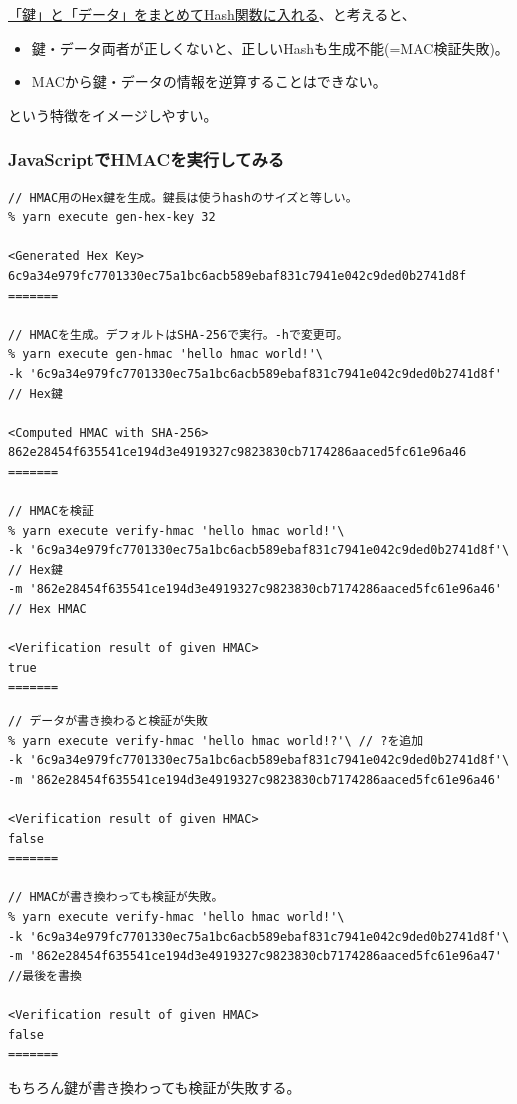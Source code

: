 \documentclass[12pt,dvipdfmx]{beamer}
\begin{document}
\begin{frame}
\underline{「鍵」と「データ」をまとめてHash関数に入れる}、と考えると、
\begin{itemize}
 \item 鍵・データ両者が正しくないと、正しいHashも生成不能(=MAC検証失敗)。
 \item MACから鍵・データの情報を逆算することはできない。
\end{itemize}
という特徴をイメージしやすい。
\end{frame}

\begin{frame}[fragile]
\frametitle{JavaScriptでHMACを実行してみる}
\begin{exampleblock}{}
\scriptsize
\begin{verbatim}
// HMAC用のHex鍵を生成。鍵長は使うhashのサイズと等しい。
% yarn execute gen-hex-key 32 

<Generated Hex Key>
6c9a34e979fc7701330ec75a1bc6acb589ebaf831c7941e042c9ded0b2741d8f
=======

// HMACを生成。デフォルトはSHA-256で実行。-hで変更可。
% yarn execute gen-hmac 'hello hmac world!'\
-k '6c9a34e979fc7701330ec75a1bc6acb589ebaf831c7941e042c9ded0b2741d8f' // Hex鍵

<Computed HMAC with SHA-256>
862e28454f635541ce194d3e4919327c9823830cb7174286aaced5fc61e96a46
=======

// HMACを検証
% yarn execute verify-hmac 'hello hmac world!'\
-k '6c9a34e979fc7701330ec75a1bc6acb589ebaf831c7941e042c9ded0b2741d8f'\ // Hex鍵
-m '862e28454f635541ce194d3e4919327c9823830cb7174286aaced5fc61e96a46' // Hex HMAC

<Verification result of given HMAC>
true
=======
\end{verbatim}
\end{exampleblock}
\end{frame}


\begin{frame}[fragile]
\begin{exampleblock}{}
\scriptsize
\begin{verbatim}
// データが書き換わると検証が失敗
% yarn execute verify-hmac 'hello hmac world!?'\ // ?を追加
-k '6c9a34e979fc7701330ec75a1bc6acb589ebaf831c7941e042c9ded0b2741d8f'\
-m '862e28454f635541ce194d3e4919327c9823830cb7174286aaced5fc61e96a46'

<Verification result of given HMAC>
false
=======

// HMACが書き換わっても検証が失敗。
% yarn execute verify-hmac 'hello hmac world!'\
-k '6c9a34e979fc7701330ec75a1bc6acb589ebaf831c7941e042c9ded0b2741d8f'\
-m '862e28454f635541ce194d3e4919327c9823830cb7174286aaced5fc61e96a47' //最後を書換

<Verification result of given HMAC>
false
=======
\end{verbatim}
\end{exampleblock}
もちろん鍵が書き換わっても検証が失敗する。
\end{frame}
\end{document}
